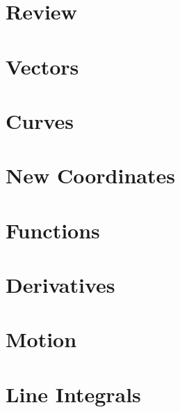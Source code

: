 \documentclass[letterpaper,oneside]{book}%
\newcommand{\wrapup}{
\bens{\section{Wrap Up}
Once you have finished the problems in the section and feel comfortable with the ideas, create a short one page lesson plan that contains examples of the key ideas.  You will get a chance to teach from this lesson plan prior to taking the exam. Then log on to Brainhoney and download the quiz. Once you have taken the quiz, you can upload your work back to brainhoney and then download the key to see how you did. If you still need to work on mastering some of the ideas, please do so and then demonstrate your mastery though the quiz corrections.}
}
\newcommand{\bens}[1]{}
\theoremstyle{plain}
\theoremstyle{box}
\begin{document}


\mainmatter

\chapter{Review}

\wrapup

\chapter{Vectors}

\wrapup


\chapter{Curves}

\wrapup

\chapter{New Coordinates}

\wrapup

\chapter{Functions}

\wrapup

\chapter{Derivatives}

\wrapup

\chapter{Motion}
\chapter{Line Integrals}
\end{document}
